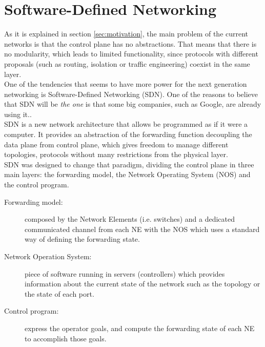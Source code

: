 \section{Software-Defined Networking}
\label{sec:sdn}

As it is explained in section \ref{sec:motivation}, the main problem of the current networks is that the control plane has no abstractions. That means that there is no modularity, which leads to limited functionality, since protocols with different proposals (such as routing, isolation or traffic engineering) coexist in the same layer.\\

One of the tendencies that seems to have more power for the next generation networking is Software-Defined Networking (SDN). One of the reasons to believe that SDN will be \emph{the one} is that some big companies, such as Google, are already using it.\cite{GoogleB4}\cite{GoogleWP}.\\

SDN is a new network architecture that allows be programmed as if it were a computer. It provides an abstraction of the forwarding function decoupling the data plane from control plane, which gives freedom to manage different topologies, protocols without many restrictions from the physical layer.\\

 SDN was designed to change that paradigm, dividing the control plane in three main layers: the forwarding model, the Network Operating System (NOS) and the control program.\\

\begin{description}
\item[Forwarding model:] composed by the Network Elements (i.e. switches) and a dedicated communicated channel from each NE with the NOS which uses a standard way of defining the forwarding state.  
\item[Network Operation System:] piece of software running in servers (controllers) which provides information about the current state of the network such as the topology or the state of each port. 
\item[Control program:] express the operator goals, and compute the forwarding state of each NE to accomplish those goals.
\end{description}





